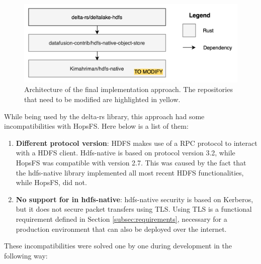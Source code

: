 \begin{figure}[!ht]
  \begin{center}
    \includegraphics[width=\textwidth]{figures/4-implementation/hdfs-native.png}
  \caption[Final solution architecture]{Architecture of the final implementation approach. The repositories that need to be modified are highlighted in yellow.}
  \label{fig:approach_2_solution_schema}
  \end{center}
\end{figure}
While being used by the delta-rs library, this approach had some incompatibilities with \gls{HopsFS}. Here below is a list of them:
\begin{enumerate}
  \item \textbf{Different  protocol version}: \gls{HDFS} makes use of a \gls{RPC} protocol to interact with a \gls{HDFS} client. Hdfs-native is based on protocol version 3.2, while \gls{HopsFS} was compatible with version 2.7. This was caused by the fact that the hdfs-native library implemented all most recent \gls{HDFS} functionalities, while \gls{HopsFS}, did not. 
  \item \textbf{No support for  in hdfs-native}: hdfs-native security is based on Kerberos, but it does not secure packet transfers using \gls{TLS}. Using \gls{TLS} is a functional requirement defined in Section \ref{subsec:requirements}, necessary for a production environment that can also be deployed over the internet.
\end{enumerate}
These incompatibilities were solved one by one during development in the following way:
